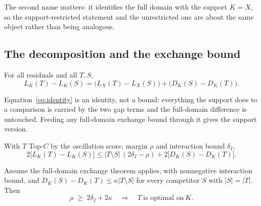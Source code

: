 
The second name matters: it identifies the full domain with the support $K=X$, so the
support-restricted statement and the unrestricted one are about the same object rather
than being analogous.

\subsection{The decomposition and the exchange bound}

\begin{theorem}
\label{thm:decomp}
For all residuals and all $T,S$,
\begin{equation}
L_{K}(T)-L_{K}(S)=\bigl(L_{X}(T)-L_{X}(S)\bigr)+\bigl(D_{K}(S)-D_{K}(T)\bigr).
\label{eq:identity}
\end{equation}
\end{theorem}


Equation~\eqref{eq:identity} is an identity, not a bound: everything the support does to a
comparison is carried by the two gap terms and the full-domain difference is untouched.
Feeding any full-domain exchange bound through it gives the support version.

\begin{theorem}
\label{thm:supportexchange}
With $T$ Top-$C$ by the oscillation score, margin $\rho$ and interaction bound
$\delta_{I}$,
\begin{equation}
2\bigl[L_{K}(T)-L_{K}(S)\bigr]\le|T\setminus S|\,(2\delta_{I}-\rho)
+2\bigl[D_{K}(S)-D_{K}(T)\bigr].
\label{eq:supportexchange}
\end{equation}
\end{theorem}


\begin{corollary}[Threshold]
\label{cor:kappa}
Assume the full-domain exchange theorem applies, with nonnegative interaction bound,
and $D_{K}(S)-D_{K}(T)\le\kappa|T\setminus S|$ for every competitor $S$ with $|S|=|T|$.
Then
\begin{equation}
\rho\;\ge\;2\delta_{I}+2\kappa\quad\Longrightarrow\quad T\ \text{is optimal on}\ K .
\label{eq:kappathreshold}
\end{equation}
\end{corollary}

